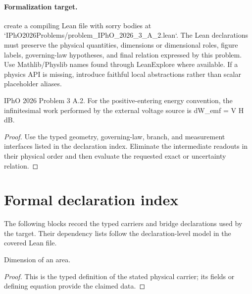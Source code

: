 \paragraph{Formalization target.}
create a compiling Lean file with sorry bodies at `IPhO2026Problems/problem\_IPhO\_2026\_3\_A\_2.lean`. The Lean declarations must preserve the physical quantities, dimensions or dimensional roles, figure labels, governing-law hypotheses, and final relation expressed by this problem.
Use Mathlib/Physlib names found through LeanExplore where available. If a physics API is missing, introduce faithful local abstractions rather than scalar placeholder aliases.

\begin{theorem}
  \label{thm:physics:IPhO_2026_3_A_2:target}
  IPhO 2026 Problem 3 A.2. For the positive-entering energy convention, the infinitesimal work performed by the external voltage source is dW\_emf = V H dB.
\end{theorem}
\begin{proof}
  Use the typed geometry, governing-law, branch, and measurement interfaces listed in the declaration index.  Eliminate the intermediate readouts in their physical order and then evaluate the requested exact or uncertainty relation.
\end{proof}
\section*{Formal declaration index}
The following blocks record the typed carriers and bridge declarations used by the target.  Their dependency lists follow the declaration-level model in the covered Lean file.

\begin{definition}
  \label{def:physics:IPhO_2026_3_A_2:aux001}
  Dimension of an area.
\end{definition}
\begin{proof}
  This is the typed definition of the stated physical carrier; its fields or defining equation provide the claimed data.
\end{proof}

